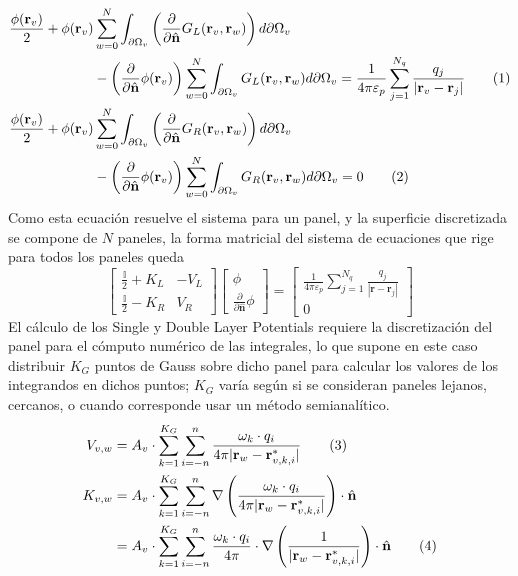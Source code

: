\documentclass[12pt, oneside, numbers, spanish]{ezthesis}
\newcommand\numberthis{\addtocounter{equation}{1}\tag{\theequation}}
\numberwithin{equation}{section}
\begin{document}
\begin{align*}
\frac{\phi(\mathbf{r}_v)}{2} + \phi(\mathbf{r}_v)&\sum_{w=0}^N \int_{\partial\Omega_v}\left(\frac{\partial}{\partial\hat{\mathbf{n}}}G_L(\mathbf{r}_v, \mathbf{r}_w)\right) d\partial\Omega_v \\
&- \left(\frac{\partial}{\partial\hat{\mathbf{n}}}\phi(\mathbf{r}_v)\right)\sum_{w=0}^N\int_{\partial\Omega_v} G_L(\mathbf{r}_v, \mathbf{r}_w) d\partial\Omega_v = \frac{1}{4\pi\varepsilon_p}\sum_{j = 1}^{N_q}\frac{q_j}{|\mathbf{r}_v - \mathbf{r}_j|} \numberthis \\
\frac{\phi(\mathbf{r}_v)}{2} + \phi(\mathbf{r}_v)&\sum_{w=0}^N \int_{\partial\Omega_v} \left(\frac{\partial}{\partial\hat{\mathbf{n}}}G_R(\mathbf{r}_v, \mathbf{r}_w)\right) d\partial\Omega_v \\
&- \left(\frac{\partial}{\partial\hat{\mathbf{n}}}\phi(\mathbf{r}_v)\right) \sum_{w=0}^N \int_{\partial\Omega_v} G_R(\mathbf{r}_v, \mathbf{r}_w) d\partial\Omega_v = 0 \numberthis
\end{align*}
Como esta ecuación resuelve el sistema para un panel, y la superficie discretizada se compone de $N$ paneles, la forma matricial del sistema de ecuaciones que rige para todos los paneles queda
\begin{equation}\label{eqn:Mem_matrix_form}
\begin{bmatrix}
\frac{\mathbb{I}}{2} + K_L & -V_L \\ \frac{\mathbb{I}}{2} - K_R & V_R
\end{bmatrix}
\begin{bmatrix}
\phi \\ \frac{\partial}{\partial\hat{\mathbf{n}}}\phi
\end{bmatrix} = 
\begin{bmatrix}
\frac{1}{4\pi\varepsilon_p}\sum_{j = 1}^{N_q}\frac{q_j}{|\mathbf{r} - \mathbf{r}_j|} \\
0
\end{bmatrix}
\end{equation}
El cálculo de los Single y Double Layer Potentials requiere la discretización del panel para el cómputo numérico de las integrales, lo que supone en este caso distribuir $K_G$ puntos de Gauss sobre dicho panel para calcular los valores de los integrandos en dichos puntos; $K_G$ varía según si se consideran paneles lejanos, cercanos, o cuando corresponde usar un método semianalítico.
\begin{align*}
V_{v,w} &= A_v\cdot\sum_{k=1}^{K_G}\sum_{i=-n}^{n}\frac{\omega_k\cdot q_i}{4\pi|\mathbf{r}_w - \mathbf{r}_{v,k,i}^*|} \numberthis\\
K_{v,w} &= A_v\cdot\sum_{k=1}^{K_G}\sum_{i=-n}^{n}\nabla\left(\frac{\omega_k\cdot q_i}{4\pi|\mathbf{r}_w - \mathbf{r}_{v,k,i}^*|}\right)\cdot\hat{\mathbf{n}} \\
&= A_v\cdot\sum_{k=1}^{K_G}\sum_{i=-n}^{n}\frac{\omega_k\cdot q_i}{4\pi}\cdot\nabla\left(\frac{1}{|\mathbf{r}_w - \mathbf{r}_{v,k,i}^*|}\right)\cdot\hat{\mathbf{n}}\numberthis
\end{align*}
\end{document}
